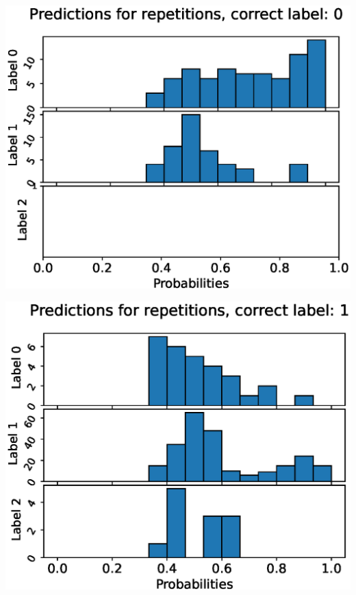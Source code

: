 \begin{center}
\begin{minipage}{0.33\textwidth}
  \includegraphics[width=\textwidth]{files/figs/app/hists/trunk/pr0.eps}
\end{minipage}%
\begin{minipage}{0.33\textwidth}
  \includegraphics[width=\textwidth]{files/figs/app/hists/trunk/pr1.eps}
\end{minipage}%
\begin{minipage}{0.33\textwidth}

\end{minipage}
\end{center}
